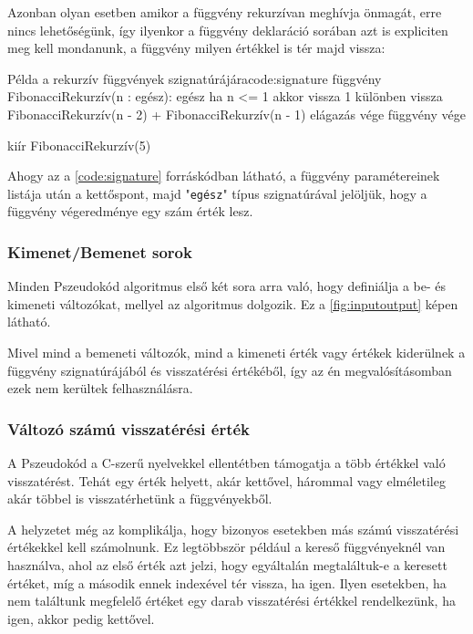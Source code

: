 Azonban olyan esetben amikor a függvény rekurzívan meghívja önmagát, erre nincs lehetőségünk, így ilyenkor a függvény deklaráció sorában azt is expliciten meg kell mondanunk, a függvény milyen értékkel is tér majd vissza:

\begin{code}{Példa a rekurzív függvények szignatúrájára}{code:signature}
függvény FibonacciRekurzív(n : egész): egész
  ha n <= 1 akkor
    vissza 1
  különben
    vissza FibonacciRekurzív(n - 2) + FibonacciRekurzív(n - 1)
  elágazás vége
függvény vége

kiír FibonacciRekurzív(5)
\end{code}

Ahogy az a \ref{code:signature} forráskódban látható, a függvény paramétereinek listája után a kettőspont, majd "\texttt{egész}" típus szignatúrával jelöljük, hogy a függvény végeredménye egy szám érték lesz.

\subsubsection{Kimenet/Bemenet sorok}

Minden Pszeudokód algoritmus első két sora arra való, hogy definiálja a be- és kimeneti változókat, mellyel az algoritmus dolgozik. Ez a \ref{fig:inputoutput} képen látható.


Mivel mind a bemeneti változók, mind a kimeneti érték vagy értékek kiderülnek a függvény szignatúrájából és visszatérési értékéből, így az én megvalósításomban ezek nem kerültek felhasználásra.

\subsubsection{Változó számú visszatérési érték}

A Pszeudokód a C-szerű nyelvekkel ellentétben támogatja a több értékkel való visszatérést. Tehát egy érték helyett, akár kettővel, hárommal vagy elméletileg akár többel is visszatérhetünk a függvényekből.

A helyzetet még az komplikálja, hogy bizonyos esetekben más számú visszatérési értékekkel kell számolnunk. Ez legtöbbször például a kereső függvényeknél van használva, ahol az első érték azt jelzi, hogy egyáltalán megtaláltuk-e a keresett értéket, míg a második ennek indexével tér vissza, ha igen. Ilyen esetekben, ha nem találtunk megfelelő értéket egy darab visszatérési értékkel rendelkezünk, ha igen, akkor pedig kettővel.

